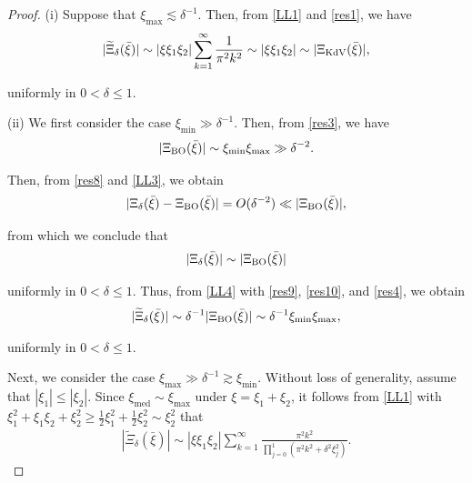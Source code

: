 \documentclass[letterpaper, 11pt,  reqno]{amsart}
\DeclareMathOperator{\med}{med}
\newcommand{\1}{\hspace{0.5mm}\textup{I}\hspace{0.5mm}}
\newcommand{\noi}{\noindent}
\newcommand{\dl}{\delta}
\newcommand{\wt}{\widetilde}
\newcommand{\les}{\lesssim}
\newcommand{\ges}{\gtrsim}
\newcommand{\BO}{\text{\rm BO} }
\newcommand{\KDV}{\text{\rm KdV} }
\numberwithin{equation}{section}
\numberwithin{theorem}{section}
\begin{document}
\begin{proof}
(i) 
Suppose that  $\xi_{\max} \les \dl^{-1}$.
Then,  from \eqref{LL1} and \eqref{res1}, we have
\begin{align*}
|\wt \Xi_\dl(\bar \xi)|
\sim  |\xi \xi_1 \xi_2|
 \sum_{k=1}^{\infty}   
 \frac1{\pi^2 k^2}
\sim  |\xi \xi_1 \xi_2|
\sim |\Xi_\KDV(\bar \xi)|, 
\end{align*}

\noi
uniformly in $0 < \dl \le 1$.






\medskip

\noi
(ii)
We first consider the case  $ \xi_{\min} \gg \dl^{-1}$.
Then,  from \eqref{res3}, 
 we have
\begin{align}
|\Xi_\BO(\bar \xi)|\sim \xi_{\min}\xi_{\max} \gg \dl^{-2}.
\label{LL3}
\end{align}

\noi
Then, 
from 
  \eqref{res8} and  \eqref{LL3}, 
we obtain
\begin{align*}
|\Xi_\dl(\bar \xi) - \Xi_\BO(\bar \xi)| = O(\dl^{-2}) \ll 
 |\Xi_\BO(\bar \xi)|, 
\end{align*}


\noi
from which we conclude that 
\begin{align}
|\Xi_\dl(\bar \xi)|\sim | \Xi_\BO(\bar \xi)|
\label{LL4}
\end{align}

\noi
uniformly in $0 < \dl \le 1$.
Thus, from 
\eqref{LL4} with 
\eqref{res9},  \eqref{res10}, 
and  \eqref{res4},
we obtain
\begin{align*}
|\wt \Xi_\dl(\bar \xi)|\sim \dl^{-1} | \Xi_\BO(\bar \xi)|
\sim    \dl^{-1} \xi_{\min}\xi_{\max}, 
\end{align*}

\noi
uniformly in $0 < \dl \le 1$.


Next, we consider the case
  $\xi_{\max} \gg    \dl^{-1} \ges  \xi_{\min}$.
Without loss of generality, 
assume that $|\xi_1|\le |\xi_2|$.
Since $\xi_{\med} \sim \xi_{\max}$ under $\xi = \xi_1 + \xi_2$, 
it follows from 
 \eqref{LL1} with 
 $\xi_1^2 + \xi_1 \xi_2 + \xi_2^2 \ge
\frac 12  \xi_1^2 + \frac 12 \xi_2^2
\sim \xi_2^2$ that 
\begin{align*}
|\wt \Xi_\dl(\bar \xi)|
\sim |\xi \xi_1 \xi_2|
 \sum_{k=1}^{\infty}   
 \frac{ \pi^2 k^2 }
 {\prod_{j = 0}^1(\pi^2k^2  +\dl^2\xi_j^2)}.
\end{align*}


\end{proof}
\end{document}
